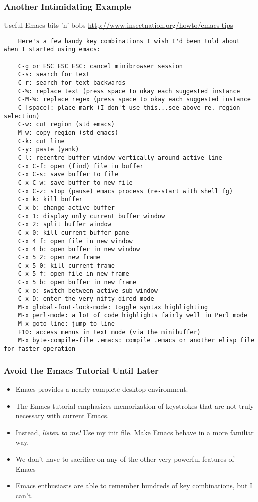 \documentclass[11pt,english]{beamer}
\begin{document}
\begin{frame}
  \frametitle{Another Intimidating Example}

  Useful Emacs bits 'n' bobs \url{http://www.insectnation.org/howto/emacs-tips}

  \begin{lstlisting}
    Here's a few handy key combinations I wish I'd been told about when I started using emacs:

    C-g or ESC ESC ESC: cancel minibrowser session
    C-s: search for text
    C-r: search for text backwards
    C-%: replace text (press space to okay each suggested instance
    C-M-%: replace regex (press space to okay each suggested instance
    C-[space]: place mark (I don't use this...see above re. region selection)
    C-w: cut region (std emacs)
    M-w: copy region (std emacs)
    C-k: cut line
    C-y: paste (yank)
    C-l: recentre buffer window vertically around active line
    C-x C-f: open (find) file in buffer
    C-x C-s: save buffer to file
    C-x C-w: save buffer to new file
    C-x C-z: stop (pause) emacs process (re-start with shell fg)
    C-x k: kill buffer
    C-x b: change active buffer
    C-x 1: display only current buffer window
    C-x 2: split buffer window
    C-x 0: kill current buffer pane
    C-x 4 f: open file in new window
    C-x 4 b: open buffer in new window
    C-x 5 2: open new frame
    C-x 5 0: kill current frame
    C-x 5 f: open file in new frame
    C-x 5 b: open buffer in new frame
    C-x o: switch between active sub-window
    C-x D: enter the very nifty dired-mode
    M-x global-font-lock-mode: toggle syntax highlighting
    M-x perl-mode: a lot of code highlights fairly well in Perl mode
    M-x goto-line: jump to line
    F10: access menus in text mode (via the minibuffer)
    M-x byte-compile-file .emacs: compile .emacs or another elisp file for faster operation
  \end{lstlisting}


\end{frame}

\begin{frame}
  \frametitle{Avoid the Emacs Tutorial Until Later}
  \begin{itemize}
  \item Emacs provides a nearly complete desktop environment.
  \item The Emacs tutorial emphasizes memorization of keystrokes that
    are not truly necessary with current Emacs.
  \item Instead, \emph{listen to me!} Use my init file. Make Emacs behave
    in a more familiar way.
  \item We don't have to sacrifice on any of the other very powerful features
    of Emacs 
  \item Emacs enthusiasts are able to remember hundreds of key
    combinations, but I can't. 
  \end{itemize}
\end{frame}
\end{document}
